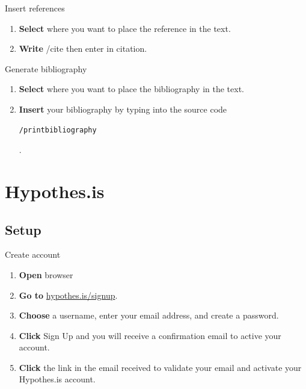 \documentclass[10pt,a4paper]{article}
\begin{document}
  

  \begin{textbox}{Insert references}
 

  

\begin{enumerate}
\item \textbf {Select} where you want to place the reference in the text.
\item \textbf {Write} /cite{} then enter in citation.
\end{enumerate}

\end{textbox}

  

 \begin{textbox}{Generate bibliography}
 

  

\begin{enumerate}
\item \textbf {Select} where you want to place the bibliography in the text.
\item \textbf{Insert} your bibliography by typing into the source code \begin{verbatim}/printbibliography\end{verbatim}.
\end{enumerate}

\end{textbox}




\section{Hypothes.is}
\subsection{Setup}

\begin{textbox}{Create account}
 

  

\begin{enumerate}
\item \textbf{Open} browser
\item \textbf{Go to} \href{hypothes.is/signup}{hypothes.is/signup}. 
\item \textbf{Choose} a username, enter your email address, and create a password.
\item \textbf{Click} Sign Up and you will receive a confirmation email to active your account.
\item \textbf{Click} the link in the email received to validate your email and activate your Hypothes.is account.
\end{enumerate}

\end{textbox}
\end{document}
